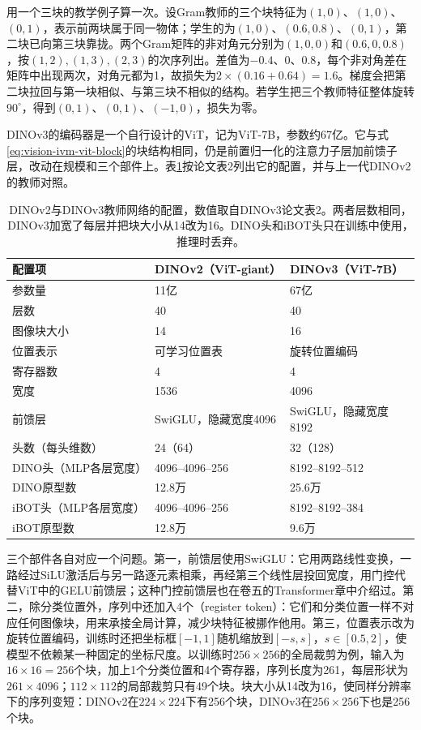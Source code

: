 用一个三块的教学例子算一次。设Gram教师的三个块特征为$(1,0)$、$(1,0)$、$(0,1)$，表示前两块属于同一物体；学生的为$(1,0)$、$(0.6,0.8)$、$(0,1)$，第二块已向第三块靠拢。两个Gram矩阵的非对角元分别为$(1,0,0)$和$(0.6,0,0.8)$，按$(1,2),(1,3),(2,3)$的次序列出。差值为$-0.4$、$0$、$0.8$，每个非对角差在矩阵中出现两次，对角元都为1，故损失为$2\times(0.16+0.64)=1.6$。梯度会把第二块拉回与第一块相似、与第三块不相似的结构。若学生把三个教师特征整体旋转$90^\circ$，得到$(0,1)$、$(0,1)$、$(-1,0)$，损失为零。

DINOv3的编码器是一个自行设计的ViT，记为ViT-7B，参数约67亿。它与式\eqref{eq:vision-ivm-vit-block}的块结构相同，仍是前置归一化的注意力子层加前馈子层，改动在规模和三个部件上。表\ref{tab:vision-ivm-dinov3-teacher}按论文表2列出它的配置，并与上一代DINOv2的教师对照。

\begin{table}[tbp]
  \centering
  \small
  \begin{tabular}{@{}lll@{}}
    \toprule
    配置项 & DINOv2（ViT-giant） & DINOv3（ViT-7B）\\
    \midrule
    参数量 & 11亿 & 67亿\\
    层数 & 40 & 40\\
    图像块大小 & 14 & 16\\
    位置表示 & 可学习位置表 & 旋转位置编码\\
    寄存器数 & 4 & 4\\
    宽度 & 1536 & 4096\\
    前馈层 & SwiGLU，隐藏宽度4096 & SwiGLU，隐藏宽度8192\\
    头数（每头维数） & 24（64） & 32（128）\\
    DINO头（MLP各层宽度） & 4096--4096--256 & 8192--8192--512\\
    DINO原型数 & 12.8万 & 25.6万\\
    iBOT头（MLP各层宽度） & 4096--4096--256 & 8192--8192--384\\
    iBOT原型数 & 12.8万 & 9.6万\\
    \bottomrule
  \end{tabular}
  \caption{DINOv2与DINOv3教师网络的配置，数值取自DINOv3论文表2。两者层数相同，DINOv3加宽了每层并把块大小从14改为16。DINO头和iBOT头只在训练中使用，推理时丢弃。}
  \label{tab:vision-ivm-dinov3-teacher}
\end{table}

三个部件各自对应一个问题。第一，前馈层使用SwiGLU：它用两路线性变换，一路经过SiLU激活后与另一路逐元素相乘，再经第三个线性层投回宽度，用门控代替ViT中的GELU前馈层；这种门控前馈层也在卷五的Transformer章中介绍过。第二，除分类位置外，序列中还加入4个（register token）：它们和分类位置一样不对应任何图像块，用来承接全局计算，减少块特征被挪作他用。第三，位置表示改为旋转位置编码，训练时还把坐标框$[-1,1]$随机缩放到$[-s,s]$，$s\in[0.5,2]$，使模型不依赖某一种固定的坐标尺度。以训练时$256\times256$的全局裁剪为例，输入为$16\times16=256$个块，加上1个分类位置和4个寄存器，序列长度为261，每层形状为$261\times4096$；$112\times112$的局部裁剪只有49个块。块大小从14改为16，使同样分辨率下的序列变短：DINOv2在$224\times224$下有256个块，DINOv3在$256\times256$下也是256个块。

